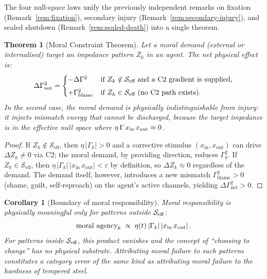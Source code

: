 \documentclass[aps,pre,twocolumn,superscriptaddress,floatfix]{revtex4-2}
\newtheorem{theorem}{Theorem}
\newtheorem{corollary}{Corollary}
\begin{document}
The four null-space laws unify the previously independent
remarks on fixation (Remark~\ref{rem:fixation}),
secondary injury (Remark~\ref{rem:secondary-injury}),
and sealed shutdown (Remark~\ref{rem:sealed-death})
into a single theorem.

\begin{theorem}[Moral Constraint Theorem]
\label{thm:moral-constraint}
Let a moral demand (external or internalised) target
an impedance pattern $Z_k$ in an agent.
The net physical effect is:
\begin{equation}
  \Delta\Gamma^2_{\textnormal{net}} =
  \begin{cases}
    -\Delta\Gamma^2 & \text{if } Z_k \notin
      \mathcal{S}_{\textnormal{eff}}
      \text{ and a C2 gradient is supplied,} \\[4pt]
    +\Gamma^2_{\textnormal{blame}} & \text{if } Z_k \in
      \mathcal{S}_{\textnormal{eff}}
      \text{ (no C2 path exists).}
  \end{cases}
  \label{eq:moral-constraint}
\end{equation}
In the second case, the moral demand is physically
indistinguishable from injury: it injects mismatch
energy that cannot be discharged, because the
target impedance is in the effective null space
where $\eta\,\Gamma\,x_{\textnormal{in}}\,x_{\textnormal{out}}
\approx 0$.
\end{theorem}

\begin{proof}
If $Z_k\notin\mathcal{S}_{\text{eff}}$, then
$\eta\,|\Gamma_k|>0$ and a corrective stimulus
$(x_{\text{in}},x_{\text{out}})$ can drive
$\Delta Z_k\neq 0$ via C2; the moral demand, by providing
direction, reduces $\Gamma_k^2$.
If $Z_k\in\mathcal{S}_{\text{eff}}$, then
$\eta\,|\Gamma_k|\,|x_{\text{in}}\,x_{\text{out}}|
<\varepsilon$ by definition, so
$\Delta Z_k\approx 0$ regardless of the demand.
The demand itself, however, introduces a new mismatch
$\Gamma_{\text{blame}}^2>0$ (shame, guilt, self-reproach)
on the agent's active channels,
yielding $\Delta\Gamma_{\text{net}}^2>0$.
\end{proof}

\begin{corollary}[Boundary of moral responsibility]
\label{cor:moral-boundary}
Moral responsibility is physically meaningful only for
patterns outside $\mathcal{S}_{\textnormal{eff}}$:
\[
  \textnormal{moral agency}_k \;\propto\;
  \eta(t)\,|\Gamma_k|\,
  |x_{\textnormal{in}}\,x_{\textnormal{out}}|\,.
\]
For patterns inside $\mathcal{S}_{\textnormal{eff}}$,
this product vanishes and the concept of
``choosing to change'' has no physical substrate.
Attributing moral failure to such patterns constitutes
a category error of the same kind as attributing
moral failure to the hardness of tempered steel.
\end{corollary}
\end{document}
